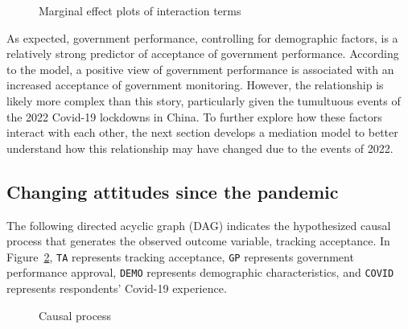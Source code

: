 \documentclass[
  letterpaper,
  DIV=11,
  numbers=noendperiod]{scrartcl}
\begin{document}
\begin{figure}
{{}


}

\caption{\label{fig-marginplotperform}Marginal effect plots of
interaction terms}

\end{figure}%

As expected, government performance, controlling for demographic
factors, is a relatively strong predictor of acceptance of government
performance. According to the model, a positive view of government
performance is associated with an increased acceptance of government
monitoring. However, the relationship is likely more complex than this
story, particularly given the tumultuous events of the 2022 Covid-19
lockdowns in China. To further explore how these factors interact with
each other, the next section develops a mediation model to better
understand how this relationship may have changed due to the events of
2022.

\subsection{Changing attitudes since the
pandemic}\label{changing-attitudes-since-the-pandemic}

The following directed acyclic graph (DAG) indicates the hypothesized
causal process that generates the observed outcome variable, tracking
acceptance. In Figure~\ref{fig-dag}, \texttt{TA} represents tracking
acceptance, \texttt{GP} represents government performance approval,
\texttt{DEMO} represents demographic characteristics, and \texttt{COVID}
represents respondents' Covid-19 experience.

\begin{figure}


\caption{\label{fig-dag}Causal process}

\end{figure}%
\end{document}
